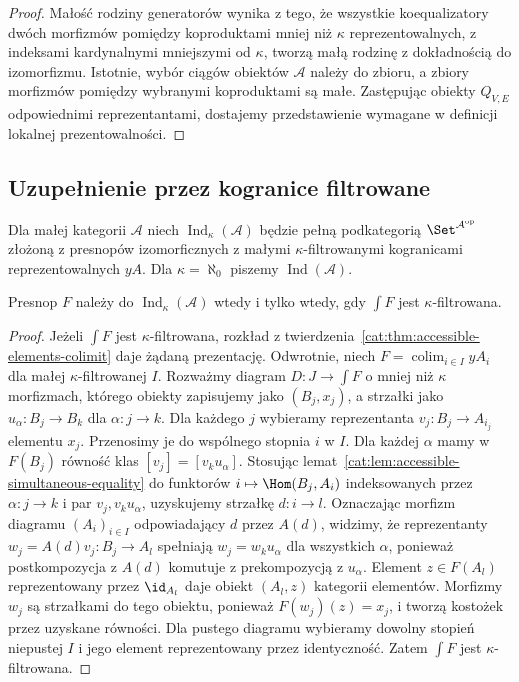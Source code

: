 \begin{proof}
Małość rodziny generatorów wynika z tego, że wszystkie koequalizatory dwóch morfizmów pomiędzy koproduktami mniej niż $\kappa$ reprezentowalnych, z indeksami kardynalnymi mniejszymi od $\kappa$, tworzą małą rodzinę z dokładnością do izomorfizmu. Istotnie, wybór ciągów obiektów $\mathcal A$ należy do zbioru, a zbiory morfizmów pomiędzy wybranymi koproduktami są małe. Zastępując obiekty $Q_{V,E}$ odpowiednimi reprezentantami, dostajemy przedstawienie wymagane w definicji lokalnej prezentowalności.
\end{proof}

\subsection{Uzupełnienie przez kogranice filtrowane}

\begin{definicja}\label{cat:def:accessible-ind}
Dla małej kategorii $\mathcal A$ niech $\operatorname{Ind}_\kappa(\mathcal A)$ będzie pełną podkategorią $\Set^{\mathcal A^{\mathrm{op}}}$ złożoną z presnopów izomorficznych z małymi $\kappa$-filtrowanymi kogranicami reprezentowalnych $yA$. Dla $\kappa=\aleph_0$ piszemy $\operatorname{Ind}(\mathcal A)$.
\end{definicja}

\begin{twierdzenie}\label{cat:thm:accessible-ind-elements}
Presnop $F$ należy do $\operatorname{Ind}_\kappa(\mathcal A)$ wtedy i tylko wtedy, gdy $\int F$ jest $\kappa$-filtrowana.
\end{twierdzenie}
\begin{proof}
Jeżeli $\int F$ jest $\kappa$-filtrowana, rozkład z twierdzenia~\ref{cat:thm:accessible-elements-colimit} daje żądaną prezentację. Odwrotnie, niech $F=\operatorname{colim}_{i\in I}yA_i$ dla małej $\kappa$-filtrowanej $I$. Rozważmy diagram $D:J\to\int F$ o mniej niż $\kappa$ morfizmach, którego obiekty zapisujemy jako $(B_j,x_j)$, a strzałki jako $u_\alpha:B_j\to B_k$ dla $\alpha:j\to k$. Dla każdego $j$ wybieramy reprezentanta $v_j:B_j\to A_{i_j}$ elementu $x_j$. Przenosimy je do wspólnego stopnia $i$ w $I$. Dla każdej $\alpha$ mamy w $F(B_j)$ równość klas $[v_j]=[v_k u_\alpha]$. Stosując lemat~\ref{cat:lem:accessible-simultaneous-equality} do funktorów $i\mapsto\Hom(B_j,A_i)$ indeksowanych przez $\alpha:j\to k$ i par $v_j,v_ku_\alpha$, uzyskujemy strzałkę $d:i\to l$. Oznaczając morfizm diagramu $(A_i)_{i\in I}$ odpowiadający $d$ przez $A(d)$, widzimy, że reprezentanty $w_j=A(d)v_j:B_j\to A_l$ spełniają $w_j=w_k u_\alpha$ dla wszystkich $\alpha$, ponieważ postkompozycja z $A(d)$ komutuje z prekompozycją z $u_\alpha$. Element $z\in F(A_l)$ reprezentowany przez $\id_{A_l}$ daje obiekt $(A_l,z)$ kategorii elementów. Morfizmy $w_j$ są strzałkami do tego obiektu, ponieważ $F(w_j)(z)=x_j$, i tworzą kostożek przez uzyskane równości. Dla pustego diagramu wybieramy dowolny stopień niepustej $I$ i jego element reprezentowany przez identyczność. Zatem $\int F$ jest $\kappa$-filtrowana.
\end{proof}

